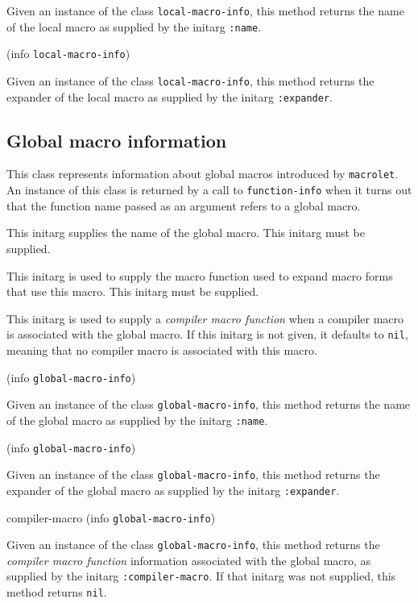 Given an instance of the class \texttt{local-macro-info}, this
method returns the name of the local macro as supplied by the
initarg \texttt{:name}.

 {(info {\tt local-macro-info})}

Given an instance of the class \texttt{local-macro-info}, this
method returns the expander of the local macro as supplied by the
initarg \texttt{:expander}.

\subsection{Global macro information}


This class represents information about global macros introduced by
\texttt{macrolet}.  An instance of this class is returned by a call to
\texttt{function-info} when it turns out that the function name passed
as an argument refers to a global macro.


This initarg supplies the name of the global macro.  This initarg
must be supplied.


This initarg is used to supply the macro function used to expand macro
forms that use this macro.  This initarg must be supplied. 


This initarg is used to supply a \emph{compiler macro function} when
a compiler macro is associated with the global macro.  If this
initarg is not given, it defaults to \texttt{nil}, meaning that no
compiler macro is associated with this macro. 

 {(info {\tt global-macro-info})}

Given an instance of the class \texttt{global-macro-info}, this
method returns the name of the global macro as supplied by the
initarg \texttt{:name}.

 {(info {\tt global-macro-info})}

Given an instance of the class \texttt{global-macro-info}, this
method returns the expander of the global macro as supplied by the
initarg \texttt{:expander}.

\Defmethod compiler-macro {(info {\tt global-macro-info})}

Given an instance of the class \texttt{global-macro-info}, this
method returns the \emph{compiler macro function} information
associated with the global macro, as supplied by the initarg
\texttt{:compiler-macro}.  If that initarg was not supplied, this
method returns \texttt{nil}.

